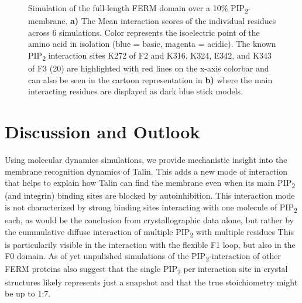 \documentclass[
  letterpaper,
  DIV=11,
  numbers=noendperiod]{scrartcl}
\begin{document}
\begin{figure}
\begin{minipage}[t]{\linewidth}
{}

\subcaption{\label{fig-ferm-memb-system}~}
\end{minipage}%

\caption{\label{fig-ferm-further}Simulation of the full-length FERM
domain over a 10\% PIP\textsubscript{2}-membrane. \textbf{a)} The Mean
interaction scores of the individual residues across 6 simulations.
Color represents the isoelectric point of the amino acid in isolation
(blue = basic, magenta = acidic). The known PIP\textsubscript{2}
interaction sites K272 of F2 and K316, K324, E342, and K343 of F3 (20)
are highlighted with red lines on the x-axis colorbar and can also be
seen in the cartoon representation in \textbf{b)} where the main
interacting residues are displayed as dark blue stick models.}

\end{figure}

\hypertarget{discussion-and-outlook}{%
\section{Discussion and Outlook}\label{discussion-and-outlook}}

Using molecular dynamics simulations, we provide mechanistic insight
into the membrane recognition dynamics of Talin. This adds a new mode of
interaction that helps to explain how Talin can find the membrane even
when its main PIP\textsubscript{2} (and integrin) binding sites are
blocked by autoinhibition. This interaction mode is not characterized by
strong binding sites interacting with one molecule of
PIP\textsubscript{2} each, as would be the conclusion from
crystallographic data alone, but rather by the cummulative diffuse
interaction of multiple PIP\textsubscript{2} with multiple residues This
is particularily visible in the interaction with the flexible F1 loop,
but also in the F0 domain. As of yet unpulished simulations of the
PIP\textsubscript{2}-interaction of other FERM proteins also suggest
that the single PIP\textsubscript{2} per interaction site in crystal
structures likely represents just a snapshot and that the true
stoichiometry might be up to 1:7.
\end{document}
